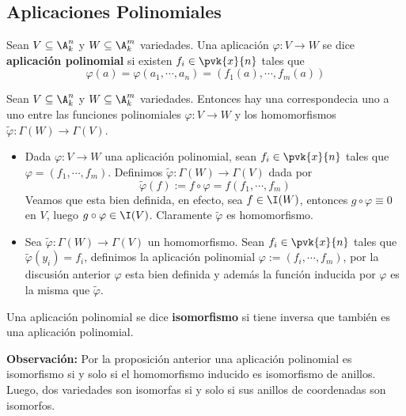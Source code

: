 \documentclass{article}
\begin{document}
\subsection{Aplicaciones Polinomiales}
\begin{dfn}
    Sean $V\subseteq\A_{k}^{n}$ y $W\subseteq\A_{k}^{m}$ variedades. Una aplicación 
    $\varphi:V\to W$ se dice \textbf{aplicación polinomial} si existen $f_{i}\in\pvk{x}{n}$ tales que
    \begin{equation*}
        \varphi(a)=\varphi(a_{1},\cdots,a_{n})=(f_{1}(a),\cdots,f_{m}(a))
    \end{equation*}
\end{dfn}
\begin{prop}
    Sean $V\subseteq\A_{k}^{n}$ y $W\subseteq\A_{k}^{m}$ variedades. Entonces hay una 
    correspondecia uno a uno entre las funciones polinomiales $\varphi:V\to W$ y los homomorfismos
    $\tilde{\varphi}:\Gamma(W)\to\Gamma(V)$.
\end{prop}
\begin{dem}\hspace{1mm}
    \begin{itemize}
        \item Dada $\varphi:V\to W$ una aplicación polinomial, sean $f_{i}\in\pvk{x}{n}$ tales que
        $\varphi=(f_{1},\cdots,f_{m})$. Definimos $\tilde{\varphi}:\Gamma(W)\to\Gamma(V)$ dada por
        \begin{equation*}
            \tilde{\varphi}(f):=f\circ\varphi=f(f_{1},\cdots,f_{m})
        \end{equation*}
        Veamos que esta bien definida, en efecto, sea $f\in\I(W)$, entonces $g\circ\varphi\equiv0$ 
        en $V$, luego $g\circ\varphi\in\I(V)$. Claramente $\tilde{\varphi}$ es homomorfismo.

        \item Sea $\tilde{\varphi}:\Gamma(W)\to\Gamma(V)$ un homomorfismo. Sean 
        $f_{i}\in\pvk{x}{n}$ tales que $\tilde{\varphi}(y_{i})=f_{i}$, definimos la aplicación 
        polinomial $\varphi:=(f_{i},\cdots,f_{m})$, por la discusión anterior $\varphi$ esta bien
        definida y además la función inducida por $\varphi$ es la misma que $\tilde{\varphi}$.
    \end{itemize}
\end{dem}
\begin{dfn}
    Una aplicación polinomial se dice \textbf{isomorfismo} si tiene inversa que también es una 
    aplicación polinomial.
\end{dfn}
\noindent\textbf{Observación:} Por la proposición anterior una aplicación polinomial es 
isomorfismo si y solo si el homomorfismo inducido es isomorfismo de anillos. Luego, dos variedades
son isomorfas si y solo si sus anillos de coordenadas son isomorfos.
\end{document}
